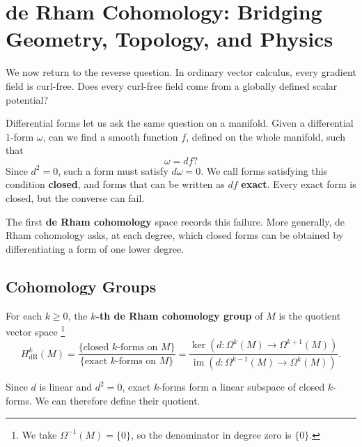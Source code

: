 \section{de Rham Cohomology: Bridging Geometry, Topology, and Physics}
\label{sec:de_rham}

We now return to the reverse question. In ordinary vector calculus, every
gradient field is curl-free. Does every curl-free field come from a globally
defined scalar potential?

Differential forms let us ask the same question on a manifold. Given a
differential $1$-form $\omega$, can we find a smooth function $f$, defined on
the whole manifold, such that
\begin{equation}
    \omega = df?
\end{equation}
Since $d^2 = 0$, such a form must satisfy $d\omega = 0$. We call forms
satisfying this condition \textbf{closed}, and forms that can be written as
$df$ \textbf{exact}. Every exact form is closed, but the converse can fail.

The first \textbf{de Rham cohomology} space records this failure. More
generally, de Rham cohomology asks, at each degree, which closed forms can be
obtained by differentiating a form of one lower degree.

\subsection{Cohomology Groups}
\begin{definition}
    For each $k \ge 0$, the \textbf{$k$-th de Rham cohomology group} of $M$ is
    the quotient vector space \cite[p.~441]{lee2013smooth}\footnote{%
        We take $\Omega^{-1}(M)=\{0\}$, so the denominator in degree zero
        is $\{0\}$.}
    \begin{equation}
        H^k_{\mathrm{dR}}(M)
        = \frac{\{\text{closed }k\text{-forms on }M\}}
               {\{\text{exact }k\text{-forms on }M\}}
        = \frac{\ker\!\left(d\colon\Omega^k(M)\to\Omega^{k+1}(M)\right)}
               {\operatorname{im}\!\left(d\colon\Omega^{k-1}(M)\to\Omega^k(M)\right)}.
    \end{equation}
\end{definition}

Since $d$ is linear and $d^2=0$, exact $k$-forms form a linear subspace of
closed $k$-forms. We can therefore define their quotient.

